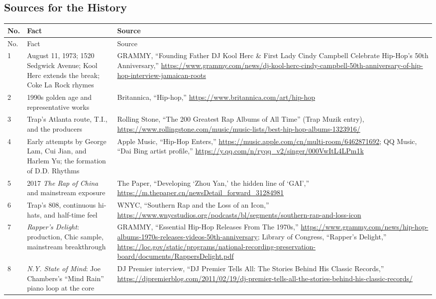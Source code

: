\subsection{Sources for the History}
\label{sec:hiphop-sources}

\begin{longtable}{p{}p{}p{}}
\toprule
No. & Fact & Source \\
\midrule
\endfirsthead
\toprule
No. & Fact & Source \\
\midrule
\endhead
1 & August 11, 1973; 1520 Sedgwick Avenue; Kool Herc extends the break; Coke La Rock rhymes & GRAMMY, ``Founding Father DJ Kool Herc \& First Lady Cindy Campbell Celebrate Hip-Hop's 50th Anniversary,'' \url{https://www.grammy.com/news/dj-kool-herc-cindy-campbell-50th-anniversary-of-hip-hop-interview-jamaican-roots} \\
2 & 1990s golden age and representative works & Britannica, ``Hip-hop,'' \url{https://www.britannica.com/art/hip-hop} \\
3 & Trap's Atlanta route, T.I., and the producers & Rolling Stone, ``The 200 Greatest Rap Albums of All Time'' (Trap Muzik entry), \url{https://www.rollingstone.com/music/music-lists/best-hip-hop-albums-1323916/} \\
4 & Early attempts by George Lam, Cui Jian, and Harlem Yu; the formation of D.D. Rhythms & Apple Music, ``Hip-Hop Enters,'' \url{https://music.apple.com/cn/multi-room/6462871692}; QQ Music, ``Dai Bing artist profile,'' \url{https://y.qq.com/n/ryqq_v2/singer/000VwItL4LPm1k} \\
5 & 2017 \emph{The Rap of China} and mainstream exposure & The Paper, ``Developing `Zhou Yan,' the hidden line of `GAI','' \url{https://m.thepaper.cn/newsDetail_forward_31284981} \\
6 & Trap's 808, continuous hi-hats, and half-time feel & WNYC, ``Southern Rap and the Loss of an Icon,'' \url{https://www.wnycstudios.org/podcasts/bl/segments/southern-rap-and-loss-icon} \\
7 & \emph{Rapper's Delight}: production, Chic sample, mainstream breakthrough & GRAMMY, ``Essential Hip-Hop Releases From The 1970s,'' \url{https://www.grammy.com/news/hip-hop-albums-1970s-releases-videos-50th-anniversary}; Library of Congress, ``Rapper's Delight,'' \url{https://loc.gov/static/programs/national-recording-preservation-board/documents/RappersDelight.pdf} \\
8 & \emph{N.Y. State of Mind}: Joe Chambers's ``Mind Rain'' piano loop at the core & DJ Premier interview, ``DJ Premier Tells All: The Stories Behind His Classic Records,'' \url{https://djpremierblog.com/2011/02/19/dj-premier-tells-all-the-stories-behind-his-classic-records/} \\

\end{longtable}

